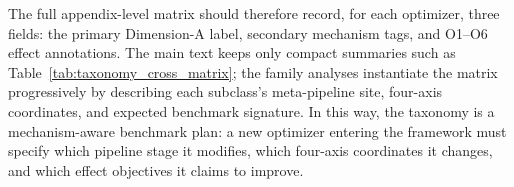The full appendix-level matrix should therefore record, for each optimizer,
three fields: the primary Dimension-A label, secondary mechanism tags, and
O1--O6 effect annotations.  The main text keeps only compact summaries such
as Table~\ref{tab:taxonomy_cross_matrix}; the family analyses instantiate the
matrix progressively by describing each subclass's meta-pipeline site,
four-axis coordinates, and expected benchmark signature.  In this way, the
taxonomy is a mechanism-aware
benchmark plan: a new optimizer entering the framework must specify which
pipeline stage it modifies, which four-axis coordinates it changes, and which
effect objectives it claims to improve.
